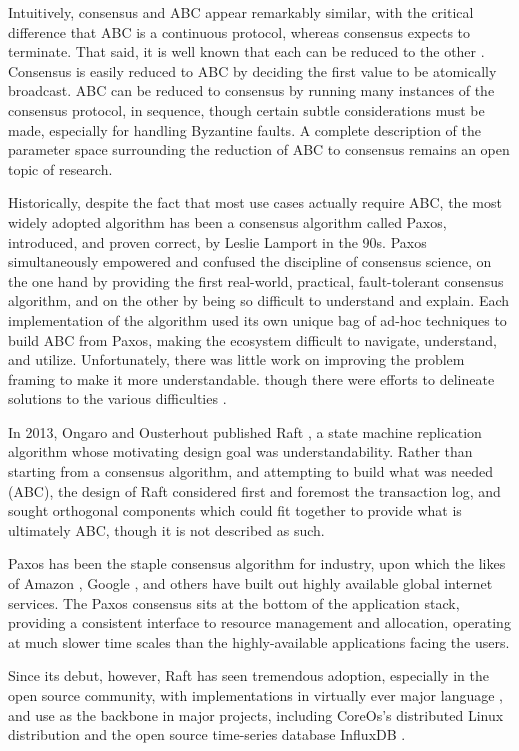 Intuitively, consensus and ABC appear remarkably similar, 
with the critical difference that ABC is a continuous protocol,
whereas consensus expects to terminate.
That said, it is well known that each can be reduced to the other \cite{chandra1996unreliable}.
Consensus is easily reduced to ABC by deciding the first value to be atomically broadcast.
ABC can be reduced to consensus by running many instances of the consensus protocol, 
in sequence, 
though certain subtle considerations must be made, 
especially for handling Byzantine faults.
A complete description of the parameter space surrounding
the reduction of ABC to consensus remains an open topic of research.

Historically, despite the fact that most use cases actually require ABC,
the most widely adopted algorithm has been a consensus algorithm called Paxos, 
introduced, and proven correct, by Leslie Lamport in the 90s.
Paxos simultaneously empowered and confused the discipline of consensus science,
on the one hand by providing the first real-world, practical, fault-tolerant consensus algorithm,
and on the other by being so difficult to understand and explain.
Each implementation of the algorithm used its own unique bag of ad-hoc techniques
to build ABC from Paxos, making the ecosystem difficult to navigate, understand, and utilize.
Unfortunately, there was little work on improving the problem framing to make it more understandable.
though there were efforts to delineate solutions to the various difficulties \cite{chandra2007paxos}.

In 2013, Ongaro and Ousterhout published Raft \cite{raft},
a state machine replication algorithm whose motivating design goal was understandability.
Rather than starting from a consensus algorithm, and attempting to build what was needed (ABC),
the design of Raft considered first and foremost the transaction log,
and sought orthogonal components which could fit together to provide what is ultimately ABC,
though it is not described as such.

Paxos has been the staple consensus algorithm for industry, 
upon which the likes of Amazon \cite{dynamo}, Google \cite{chubby}, 
and others have built out highly available global internet services.
The Paxos consensus sits at the bottom of the application stack, 
providing a consistent interface to resource management and allocation, 
operating at much slower time scales than the highly-available applications facing the users.

Since its debut, however, Raft has seen tremendous adoption, especially in the open source community,
with implementations in virtually ever major language \cite{raft.github.io},
and use as the backbone in major projects, 
including CoreOs's distributed Linux distribution \cite{coreos_raft} 
and the open source time-series database InfluxDB \cite{influxdb,hashicorp_raft}.

